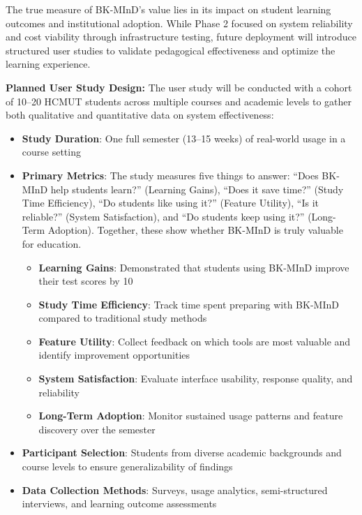 The true measure of BK-MInD's value lies in its impact on student learning outcomes and institutional adoption. While Phase 2 focused on system reliability and cost viability through infrastructure testing, future deployment will introduce structured user studies to validate pedagogical effectiveness and optimize the learning experience.

\textbf{Planned User Study Design:} The user study will be conducted with a cohort of 10--20 HCMUT students across multiple courses and academic levels to gather both qualitative and quantitative data on system effectiveness:

\begin{itemize}
    \item \textbf{Study Duration}: One full semester (13--15 weeks) of real-world usage in a course setting
    \item \textbf{Primary Metrics}: The study measures five things to answer: ``Does BK-MInD help students learn?'' (Learning Gains), ``Does it save time?'' (Study Time Efficiency), ``Do students like using it?'' (Feature Utility), ``Is it reliable?'' (System Satisfaction), and ``Do students keep using it?'' (Long-Term Adoption). Together, these show whether BK-MInD is truly valuable for education.
    \begin{itemize}
        \item \textbf{Learning Gains}: Demonstrated that students using BK-MInD improve their test scores by 10%
        \item \textbf{Study Time Efficiency}: Track time spent preparing with BK-MInD compared to traditional study methods
        \item \textbf{Feature Utility}: Collect feedback on which tools are most valuable and identify improvement opportunities
        \item \textbf{System Satisfaction}: Evaluate interface usability, response quality, and reliability
        \item \textbf{Long-Term Adoption}: Monitor sustained usage patterns and feature discovery over the semester
    \end{itemize}
    \item \textbf{Participant Selection}: Students from diverse academic backgrounds and course levels to ensure generalizability of findings
    \item \textbf{Data Collection Methods}: Surveys, usage analytics, semi-structured interviews, and learning outcome assessments
\end{itemize}

